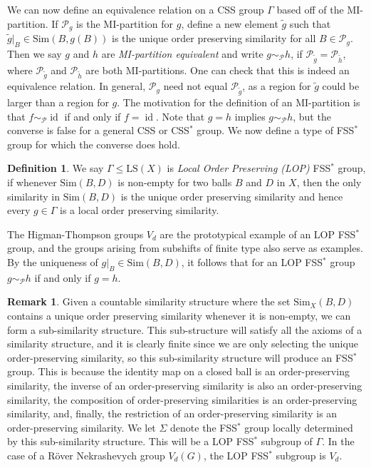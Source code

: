 \documentclass[12pt]{amsart}
\numberwithin{equation}{subsection}
\theoremstyle{definition}
\theoremstyle{definition}
\newtheorem{definition}[theorem]{Definition}
\newtheorem{remark}[theorem]{Remark}
\theoremstyle{remark}
\newcommand{\Sim}{\text{Sim}}
\begin{document}
We can now define an equivalence relation on a CSS group $\Gamma$ based off of the MI-partition. If $\mathcal P_g$ is the MI-partition for $g$, define a new element $\tilde g$ such that $\tilde{g}\vert_B \in \text{Sim}(B,g(B))$ is the unique order preserving similarity for all $B \in \mathcal P_g$. Then we say $g$ and $h$ are \emph{MI-partition equivalent} and write $g \sim_\mathcal P h$, if $\mathcal P_{\tilde{g}} = \mathcal P_{\tilde h}$, where $\mathcal P_{\tilde{g}}$ and $\mathcal P_{\tilde h}$ are both MI-partitions. One can check that this is indeed an equivalence relation. In general, $\mathcal P_g$ need not equal $\mathcal P_{\tilde{g}}$, as a region for $\tilde{g}$ could be larger than a region for $g$. The motivation for the definition of an MI-partition is that $f \sim_\mathcal P\operatorname{id}$ if and only if $f = \operatorname{id}$. Note that $g = h$ implies $g\sim_\mathcal P h$, but the converse is false for a general CSS or CSS$^*$ group. We now define a type of FSS$^*$ group for which the converse does hold.

\begin{definition}
    We say $\Gamma \leq \text{LS}(X)$ is \emph{Local Order Preserving (LOP)} FSS$^*$ group, if whenever $\text{Sim}(B,D)$ is non-empty for two balls $B$ and $D$ in $X$, then the only similarity in $\text{Sim}(B,D)$ is the unique order preserving similarity and hence every $g \in \Gamma$ is a local order preserving similarity.
\end{definition} 
The Higman-Thompson groups $V_d$ are the prototypical example of an LOP FSS$^*$ group, and the groups arising from subshifts of finite type also serve as examples. By the uniqueness of $g\vert_B \in \text{Sim}(B,D)$, it follows that for an LOP FSS$^*$ group $g \sim_\mathcal P h$ if and only if $g =h$.

\begin{remark}
    Given a countable similarity structure where the set $\Sim_{X}(B,D)$ contains a unique order preserving similarity whenever it is non-empty, we can form a sub-similarity structure. This sub-structure will satisfy all the axioms of a similarity structure, and it is clearly finite since we are only selecting the unique order-preserving similarity, so this sub-similarity structure will produce an FSS$^*$ group. This is because the identity map on a closed ball is an order-preserving similarity, the inverse of an order-preserving similarity is also an order-preserving similarity, the composition of order-preserving similarities is an order-preserving similarity, and, finally, the restriction of an order-preserving similarity is an order-preserving similarity. We let $\Sigma$ denote the FSS$^*$ group locally determined by this sub-similarity structure. This will be a LOP FSS$^*$ subgroup of $\Gamma$. In the case of a R\"over Nekrashevych group $V_d(G)$, the LOP FSS$^*$ subgroup is $V_d$. 
\end{remark}
\end{document}
